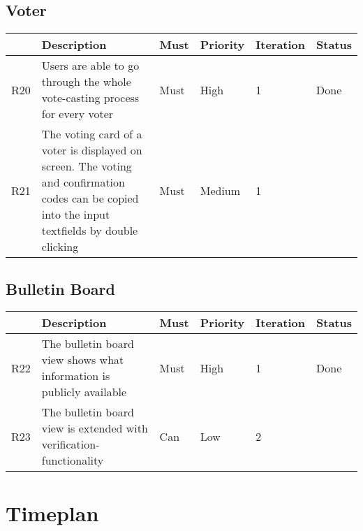 \subsection{Voter}
\begin{longtable}{p{0.4cm}p{9cm}p{1cm}p{1cm}p{1cm}p{1cm}}
\hline
 & Description & Must & Priority & Iteration & Status\\
\hline
R20 & Users are able to go through the whole vote-casting process for every voter & Must & High & 1 & Done\\
R21 & The voting card of a voter is displayed on screen. The voting and confirmation codes can be copied into the input textfields by double clicking & Must & Medium & 1 & \\
\end{longtable}


\subsection{Bulletin Board}
\begin{longtable}{p{0.4cm}p{9cm}p{1cm}p{1cm}p{1cm}p{1cm}}
\hline
 & Description & Must & Priority & Iteration & Status\\
\hline
R22 & The bulletin board view shows what information is publicly available & Must & High & 1 & Done\\
R23 & The bulletin board view is extended with verification-functionality & Can & Low & 2 & \\
\end{longtable}


\section{Timeplan}
